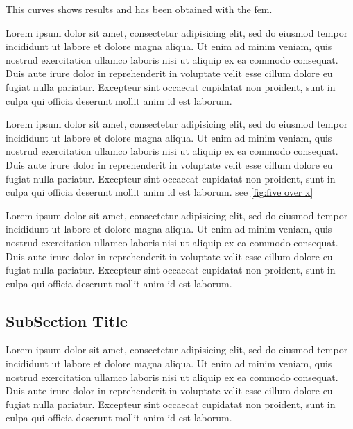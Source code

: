         This curves shows results and has been obtained with the \gls{fem}. 


        Lorem ipsum dolor sit amet, consectetur adipisicing elit, sed do eiusmod tempor incididunt ut labore et dolore magna aliqua. Ut enim ad minim veniam, quis nostrud exercitation ullamco laboris nisi ut aliquip ex ea commodo consequat. Duis aute irure dolor in reprehenderit in voluptate velit esse cillum dolore eu fugiat nulla pariatur. Excepteur sint occaecat cupidatat non proident, sunt in culpa qui officia deserunt mollit anim id est laborum.

        Lorem ipsum dolor sit amet, consectetur adipisicing elit, sed do eiusmod tempor incididunt ut labore et dolore magna aliqua. Ut enim ad minim veniam, quis nostrud exercitation ullamco laboris nisi ut aliquip ex ea commodo consequat. Duis aute irure dolor in reprehenderit in voluptate velit esse cillum dolore eu fugiat nulla pariatur. Excepteur sint occaecat cupidatat non proident, sunt in culpa qui officia deserunt mollit anim id est laborum.
        see \ref{fig:five over x}

        Lorem ipsum dolor sit amet, consectetur adipisicing elit, sed do eiusmod tempor incididunt ut labore et dolore magna aliqua. Ut enim ad minim veniam, quis nostrud exercitation ullamco laboris nisi ut aliquip ex ea commodo consequat. Duis aute irure dolor in reprehenderit in voluptate velit esse cillum dolore eu fugiat nulla pariatur. Excepteur sint occaecat cupidatat non proident, sunt in culpa qui officia deserunt mollit anim id est laborum.

        \subsection{SubSection Title}
        Lorem ipsum dolor sit amet, consectetur adipisicing elit, sed do eiusmod tempor incididunt ut labore et dolore magna aliqua. Ut enim ad minim veniam, quis nostrud exercitation ullamco laboris nisi ut aliquip ex ea commodo consequat. Duis aute irure dolor in reprehenderit in voluptate velit esse cillum dolore eu fugiat nulla pariatur. Excepteur sint occaecat cupidatat non proident, sunt in culpa qui officia deserunt mollit anim id est laborum.
